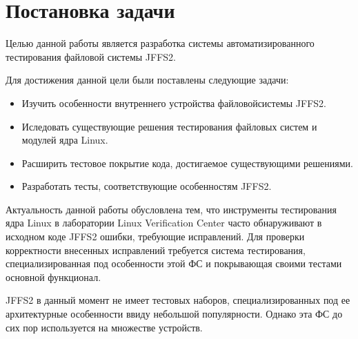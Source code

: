 \section{Постановка задачи}
\label{sec:Chapter1} 

Целью данной работы является разработка системы автоматизированного тестирования файловой системы JFFS2.

Для достижения данной цели были поставлены следующие задачи:

\begin{itemize}
	\item Изучить особенности внутреннего устройства файловойсистемы JFFS2.
	\item Иследовать существующие решения тестирования файловых систем и модулей ядра Linux.
	\item Расширить тестовое покрытие кода, достигаемое существующими решениями.
	\item Разработать тесты, соответствующие особенностям JFFS2.
\end{itemize}

Актуальность данной работы обусловлена тем, что инструменты тестирования ядра Linux в лаборатории Linux Verification Center часто обнаруживают в исходном коде JFFS2 ошибки, требующие исправлений. Для проверки корректности внесенных исправлений требуется система тестирования, специализированная под особенности этой ФС и покрывающая своими тестами основной функционал.

JFFS2 в данный момент не имеет тестовых наборов, специализированных под ее архитектурные особенности ввиду небольшой популярности. Однако эта ФС до сих пор используется на множестве устройств.

\newpage
